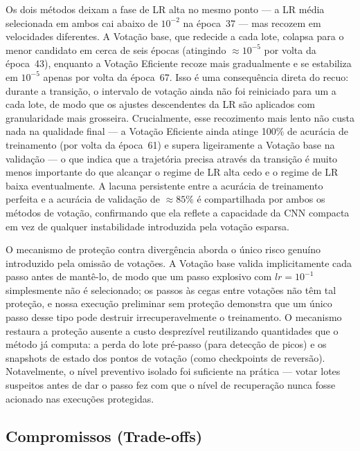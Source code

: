 \documentclass[conference]{IEEEtran}
\begin{document}
Os dois métodos deixam a fase de LR alta no mesmo ponto --- a LR média selecionada em ambos cai abaixo de $10^{-2}$ na época~37 --- mas recozem em velocidades diferentes. A Votação base, que redecide a cada lote, colapsa para o menor candidato em cerca de seis épocas (atingindo $\approx 10^{-5}$ por volta da época~43), enquanto a Votação Eficiente recoze mais gradualmente e se estabiliza em $10^{-5}$ apenas por volta da época~67. Isso é uma consequência direta do recuo: durante a transição, o intervalo de votação ainda não foi reiniciado para um a cada lote, de modo que os ajustes descendentes da LR são aplicados com granularidade mais grosseira. Crucialmente, esse recozimento mais lento não custa nada na qualidade final --- a Votação Eficiente ainda atinge 100\% de acurácia de treinamento (por volta da época~61) e supera ligeiramente a Votação base na validação --- o que indica que a trajetória precisa através da transição é muito menos importante do que alcançar o regime de LR alta cedo e o regime de LR baixa eventualmente. A lacuna persistente entre a acurácia de treinamento perfeita e a acurácia de validação de $\approx 85\%$ é compartilhada por ambos os métodos de votação, confirmando que ela reflete a capacidade da CNN compacta em vez de qualquer instabilidade introduzida pela votação esparsa.

O mecanismo de proteção contra divergência aborda o único risco genuíno introduzido pela omissão de votações. A Votação base valida implicitamente cada passo antes de mantê-lo, de modo que um passo explosivo com $lr = 10^{-1}$ simplesmente não é selecionado; os passos às cegas entre votações não têm tal proteção, e nossa execução preliminar sem proteção demonstra que um único passo desse tipo pode destruir irrecuperavelmente o treinamento. O mecanismo restaura a proteção ausente a custo desprezível reutilizando quantidades que o método já computa: a perda do lote pré-passo (para detecção de picos) e os snapshots de estado dos pontos de votação (como checkpoints de reversão). Notavelmente, o nível preventivo isolado foi suficiente na prática --- votar lotes suspeitos antes de dar o passo fez com que o nível de recuperação nunca fosse acionado nas execuções protegidas.

\subsection{Compromissos (Trade-offs)}
\end{document}
